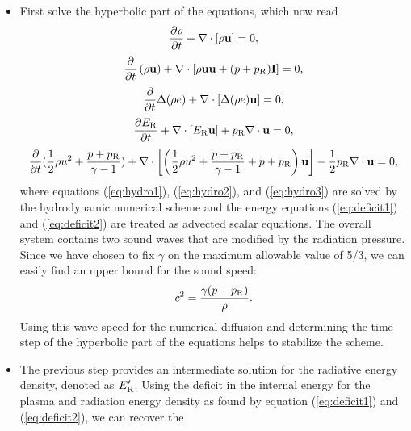 \documentclass[12pt]{article}
\begin{document}
\begin{itemize} 
\item First solve the hyperbolic part of the equations, which now read 
\begin{equation}\label{eq:hydro1} \frac{\partial\rho}{\partial t} +
\nabla\cdot\left[ \rho {\bf u} \right] = 0, \end{equation} 
\begin{equation}\label{eq:hydro2}   \frac{\partial}{\partial t}\left( 
\rho {\bf u} \right) + \nabla\cdot\left[ \rho{\bf u}{\bf u}     
+(p+p_{\rm R}){\bf I} \right] = 0, 
\end{equation} 
\begin{equation}\label{eq:deficit1}   
\frac{\partial}{\partial t} \Delta(\rho e) + \nabla\cdot\left[  
\Delta(\rho e) {\bf u} \right] = 0, 
\end{equation} 
\begin{equation}\label{eq:deficit2}   
\frac{\partial E_{\rm R}}{\partial t} + \nabla\cdot \left[ E_{\rm R} {\bf u} 
\right]   + p_{\rm R}\nabla\cdot{\bf u} = 0, 
\end{equation} 
\begin{equation}\label{eq:hydro3}   \frac{\partial}{\partial t} 
(\frac{1}{2}\rho u^2 + \frac{p+p_{\rm R}}{\gamma - 1}) + \nabla\cdot   
\left[ \left( \frac{1}{2}\rho u^2 + \frac{p+p_{\rm R}}{\gamma - 1} + 
p+p_{\rm R} \right) {\bf u} \right]   - 
\frac{1}{2}p_{\rm R}\nabla\cdot{\bf u} = 0, 
\end{equation} 
where equations (\ref{eq:hydro1}), (\ref{eq:hydro2}), and (\ref{eq:hydro3}) 
are solved by the hydrodynamic numerical scheme and the energy equations 
(\ref{eq:deficit1}) and (\ref{eq:deficit2}) are treated as advected scalar 
equations. The overall system contains two sound waves that are modified by 
the radiation pressure. Since we have chosen to fix $\gamma$ on the maximum 
allowable value of 5/3, we can easily find an upper bound for the sound speed: 
\begin{equation}  
c^2=\frac{\gamma (p+p_{\rm R})}{\rho}. 
\end{equation} 
Using this wave speed for the numerical diffusion and determining the time 
step of the hyperbolic part of the equations helps to stabilize the scheme.  
\item The previous step provides an intermediate solution for the radiative 
energy density, denoted as $E_{\rm R}^\prime$. Using the deficit in the 
internal energy for the plasma and radiation energy density as found by 
equation (\ref{eq:deficit1}) and (\ref{eq:deficit2}), we can recover the 

\end{itemize}
\end{document}
